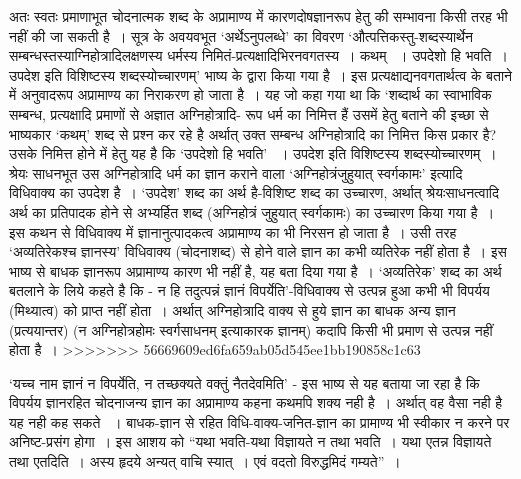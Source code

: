 अतः स्वतः प्रमाणाभूत चोदनात्मक शब्द के अप्रामाण्य में कारणदोषज्ञानरूप हेतु की सम्भावना किसी तरह भी नहीं की जा सकती है~। सूत्र के अवयवभूत ‘अर्थेऽनुपलब्धे' का विवरण ‘औत्पत्तिकस्तु-शब्दस्यार्थेन सम्बन्धस्तस्याग्निहोत्रादिलक्षणस्य धर्मस्य निमितं-प्रत्यक्षादिभिरनवगतस्य~। कथम् ~। उपदेशो हि भवति~। उपदेश इति विशिष्टस्य शब्दस्योच्चारणम्' भाष्य के द्वारा किया गया है~। इस प्रत्यक्षाद्यनवगतार्थत्व के बताने में अनुवादरूप अप्रामाण्य का निराकरण हो जाता है~। यह जो कहा गया था कि ‘शब्दार्थ का स्वाभाविक सम्बन्ध, प्रत्यक्षादि प्रमाणों से अज्ञात अग्निहोत्रादि- रूप धर्म का निमित्त हैं उसमें हेतु बताने की इच्छा से भाष्यकार ‘कथम्' शब्द से प्रश्न कर रहे है अर्थात् उक्त सम्बन्ध अग्निहोत्रादि का निमित्त किस प्रकार है? उसके निमित्त होने में हेतु यह है कि ‘उपदेशो हि भवति' ~। उपदेश इति विशिष्टस्य शब्दस्योच्चारणम्~। श्रेयः साधनभूत उस अग्निहोत्रादि धर्म का ज्ञान कराने वाला ‘अग्निहोत्रंजुहुयात् स्वर्गकामः' इत्यादि विधिवाक्य का उपदेश है~। ‘उपदेश' शब्द का अर्थ है-विशिष्ट शब्द का उच्चारण, अर्थात् श्रेयःसाधनत्वादि अर्थ का प्रतिपादक होने से अभ्यर्हित शब्द (अग्निहोत्रं जुहुयात् स्वर्गकामः) का उच्चारण किया गया है~। इस कथन से विधिवाक्य में ज्ञानानुत्पादकत्व अप्रामाण्य का भी निरसन हो जाता है~। उसी तरह ‘अव्यतिरेकश्च ज्ञानस्य' विधिवाक्य (चोदनाशब्द) से होने वाले ज्ञान का कभी व्यतिरेक नहीं होता है~। इस भाष्य से बाधक ज्ञानरूप अप्रामाण्य कारण भी नहीं है, यह बता दिया गया है~। ‘अव्यतिरेक' शब्द का अर्थ बतलाने के लिये कहते है कि - न हि तदुत्पन्नं ज्ञानं विपर्येति'-विधिवाक्य से उत्पन्न हुआ कभी भी विपर्यय (मिथ्यात्व) को प्राप्त नहीं होता~। अर्थात् अग्निहोत्रादि वाक्य से हुये ज्ञान का बाधक अन्य ज्ञान (प्रत्ययान्तर) (न अग्निहोत्रहोमः स्वर्गसाधनम् इत्याकारक ज्ञानम्) कदापि किसी भी प्रमाण से उत्पन्न नहीं होता है~। 
>>>>>>> 56669609ed6fa659ab05d545ee1bb190858c1c63

‘यच्च नाम ज्ञानं न विपर्येति, न तच्छक्यते वक्तुं नैतदेवमिति' - इस भाष्य से यह बताया जा रहा है कि विपर्यय ज्ञानरहित चोदनाजन्य ज्ञान का अप्रामाण्य कहना कथमपि शक्य नही है~। अर्थात् वह वैसा नही है यह नही कह सकते ~। बाधक-ज्ञान से रहित विधि-वाक्य-जनित-ज्ञान का प्रामाण्य भी स्वीकार न करने पर अनिष्ट-प्रसंग होगा~। इस आशय को “यथा भवति-यथा विज्ञायते न तथा भवति~। यथा एतन्न विज्ञायते तथा एतदिति~। अस्य हृदये अन्यत् वाचि स्यात्~। एवं वदतो विरुद्धमिदं गम्यते”~।

